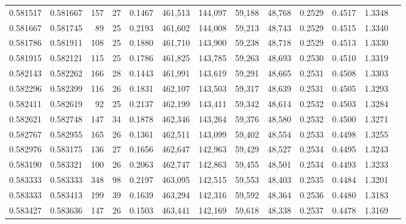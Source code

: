 \begin{tabular}{rrrrrrrrrrrrr}
0.581517 & 0.581667 &    157 &    27 &                                     0.1467 & 461,513 & 144,097 &  59,188 &  48,768 & 0.2529 & 0.4517 & 1.3348 \\
0.581667 & 0.581745 &     89 &    25 &                                     0.2193 & 461,602 & 144,008 &  59,213 &  48,743 & 0.2529 & 0.4515 & 1.3340 \\
0.581786 & 0.581911 &    108 &    25 &                                     0.1880 & 461,710 & 143,900 &  59,238 &  48,718 & 0.2529 & 0.4513 & 1.3330 \\
0.581915 & 0.582121 &    115 &    25 &                                     0.1786 & 461,825 & 143,785 &  59,263 &  48,693 & 0.2530 & 0.4510 & 1.3319 \\
0.582143 & 0.582262 &    166 &    28 &                                     0.1443 & 461,991 & 143,619 &  59,291 &  48,665 & 0.2531 & 0.4508 & 1.3303 \\
0.582296 & 0.582399 &    116 &    26 &                                     0.1831 & 462,107 & 143,503 &  59,317 &  48,639 & 0.2531 & 0.4505 & 1.3293 \\
0.582411 & 0.582619 &     92 &    25 &                                     0.2137 & 462,199 & 143,411 &  59,342 &  48,614 & 0.2532 & 0.4503 & 1.3284 \\
0.582621 & 0.582748 &    147 &    34 &                                     0.1878 & 462,346 & 143,264 &  59,376 &  48,580 & 0.2532 & 0.4500 & 1.3271 \\
0.582767 & 0.582955 &    165 &    26 &                                     0.1361 & 462,511 & 143,099 &  59,402 &  48,554 & 0.2533 & 0.4498 & 1.3255 \\
0.582976 & 0.583175 &    136 &    27 &                                     0.1656 & 462,647 & 142,963 &  59,429 &  48,527 & 0.2534 & 0.4495 & 1.3243 \\
0.583190 & 0.583321 &    100 &    26 &                                     0.2063 & 462,747 & 142,863 &  59,455 &  48,501 & 0.2534 & 0.4493 & 1.3233 \\
0.583333 & 0.583333 &    348 &    98 &                                     0.2197 & 463,095 & 142,515 &  59,553 &  48,403 & 0.2535 & 0.4484 & 1.3201 \\
0.583333 & 0.583413 &    199 &    39 &                                     0.1639 & 463,294 & 142,316 &  59,592 &  48,364 & 0.2536 & 0.4480 & 1.3183 \\
0.583427 & 0.583636 &    147 &    26 &                                     0.1503 & 463,441 & 142,169 &  59,618 &  48,338 & 0.2537 & 0.4478 & 1.3169 \\

\end{tabular}
